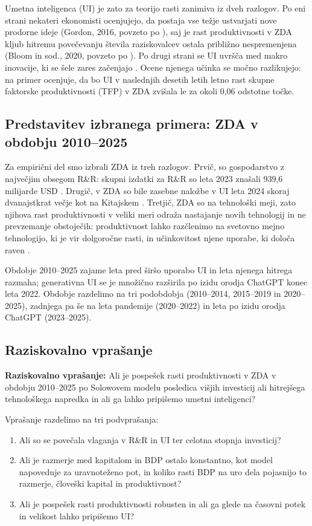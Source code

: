 \documentclass[12pt,a4paper]{article}
\begin{document}
Umetna inteligenca (UI) je zato za teorijo rasti zanimiva iz dveh razlogov. Po eni strani nekateri ekonomisti ocenjujejo, da postaja vse težje ustvarjati nove prodorne ideje (Gordon, 2016, povzeto po \cite[pros.~136]{grobovsek2026}), saj je rast produktivnosti v ZDA kljub hitremu povečevanju števila raziskovalcev ostala približno nespremenjena (Bloom in sod., 2020, povzeto po \cite[pros.~136--137]{grobovsek2026}). Po drugi strani se UI uvršča med makro inovacije, ki se šele zares začenjajo \parencite[pros.~139]{grobovsek2026}. Ocene njenega učinka se močno razlikujejo: \textcite[29]{acemoglu2024} na primer ocenjuje, da bo UI v naslednjih desetih letih letno rast skupne faktorske produktivnosti (TFP) v ZDA zvišala le za okoli 0,06 odstotne točke.

\subsection{Predstavitev izbranega primera: ZDA v obdobju 2010--2025}
Za empirični del smo izbrali ZDA iz treh razlogov. Prvič, so gospodarstvo z največjim obsegom R\&R: skupni izdatki za R\&R so leta 2023 znašali 939,6 milijarde USD \parencite[tab.~DISC-1]{nsb2025}. Drugič, v ZDA so bile zasebne naložbe v UI leta 2024 skoraj dvanajstkrat večje kot na Kitajskem \parencite{aiindex2025}. Tretjič, ZDA so na tehnološki meji, zato njihova rast produktivnosti v veliki meri odraža nastajanje novih tehnologij in ne prevzemanje obstoječih: produktivnost lahko razčlenimo na svetovno mejno tehnologijo, ki je vir dolgoročne rasti, in učinkovitost njene uporabe, ki določa raven \parencite[pros.~119--120]{grobovsek2026}.

Obdobje 2010--2025 zajame leta pred širšo uporabo UI in leta njenega hitrega razmaha; generativna UI se je množično razširila po izidu orodja ChatGPT konec leta 2022. Obdobje razdelimo na tri podobdobja (2010--2014, 2015--2019 in 2020--2025), zadnjega pa še na leta pandemije (2020--2022) in leta po izidu orodja ChatGPT (2023--2025).

\subsection{Raziskovalno vprašanje}\label{sec:rv}
\noindent\textbf{Raziskovalno vprašanje:} Ali je pospešek rasti produktivnosti v ZDA v obdobju 2010--2025 po Solowovem modelu posledica višjih investicij ali hitrejšega tehnološkega napredka in ali ga lahko pripišemo umetni inteligenci?

Vprašanje razdelimo na tri podvprašanja:
\begin{enumerate}
    \item Ali so se povečala vlaganja v R\&R in UI ter celotna stopnja investicij?
    \item Ali je razmerje med kapitalom in BDP ostalo konstantno, kot model napoveduje za uravnoteženo pot, in koliko rasti BDP na uro dela pojasnijo to razmerje, človeški kapital in produktivnost?
    \item Ali je pospešek rasti produktivnosti robusten in ali ga glede na časovni potek in velikost lahko pripišemo UI?
\end{enumerate}
\end{document}
